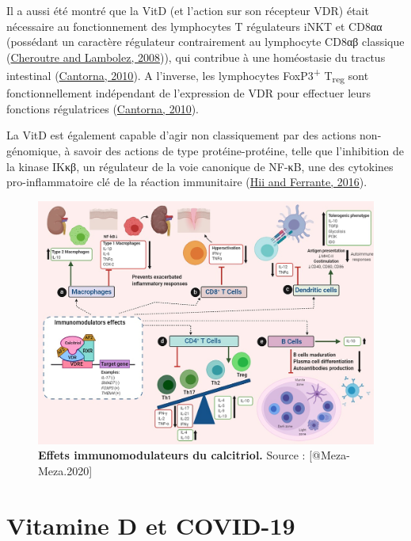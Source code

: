 \documentclass[
  letterpaper,
  DIV=11,
  numbers=noendperiod]{scrartcl}
\begin{document}
Il a aussi été montré que la VitD (et l'action sur son récepteur VDR)
était nécessaire au fonctionnement des lymphocytes T régulateurs iNKT et
CD8αα (possédant un caractère régulateur contrairement au lymphocyte
CD8αβ classique (\protect\hyperlink{ref-Cheroutre.2008}{Cheroutre and
Lambolez, 2008})), qui contribue à une homéostasie du tractus intestinal
(\protect\hyperlink{ref-Cantorna.2010}{Cantorna, 2010}). A l'inverse,
les lymphocytes FoxP3\textsuperscript{+} T\textsubscript{reg} sont
fonctionnellement indépendant de l'expression de VDR pour effectuer
leurs fonctions régulatrices
(\protect\hyperlink{ref-Cantorna.2010}{Cantorna, 2010}).

La VitD est également capable d'agir non classiquement par des actions
non-génomique, à savoir des actions de type protéine-protéine, telle que
l'inhibition de la kinase IKκβ, un régulateur de la voie canonique de
NF-κB, une des cytokines pro-inflammatoire clé de la réaction
immunitaire (\protect\hyperlink{ref-Hii.2016}{Hii and Ferrante, 2016}).

\begin{figure}
\includegraphics{figures/calcitriol-immunomodulatory.jpg} 
\caption[\textbf{Effets immunomodulateurs du calcitriol.}]{\textbf{Effets immunomodulateurs du calcitriol.} Source : [@Meza-Meza.2020]}\label{immunomod}
\end{figure}

\hypertarget{vitamine-d-et-covid-19}{%
\section{Vitamine D et COVID-19}\label{vitamine-d-et-covid-19}}
\end{document}
